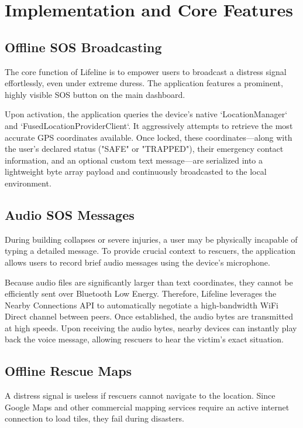 
\chapter{Implementation and Core Features} 

\label{Chapter4}

\section{Offline SOS Broadcasting}
The core function of Lifeline is to empower users to broadcast a distress signal effortlessly, even under extreme duress. The application features a prominent, highly visible SOS button on the main dashboard. 

Upon activation, the application queries the device's native `LocationManager` and `FusedLocationProviderClient`. It aggressively attempts to retrieve the most accurate GPS coordinates available. Once locked, these coordinates—along with the user's declared status ("SAFE" or "TRAPPED"), their emergency contact information, and an optional custom text message—are serialized into a lightweight byte array payload and continuously broadcasted to the local environment.

\section{Audio SOS Messages}
During building collapses or severe injuries, a user may be physically incapable of typing a detailed message. To provide crucial context to rescuers, the application allows users to record brief audio messages using the device's microphone. 

Because audio files are significantly larger than text coordinates, they cannot be efficiently sent over Bluetooth Low Energy. Therefore, Lifeline leverages the Nearby Connections API to automatically negotiate a high-bandwidth WiFi Direct channel between peers. Once established, the audio bytes are transmitted at high speeds. Upon receiving the audio bytes, nearby devices can instantly play back the voice message, allowing rescuers to hear the victim's exact situation.

\section{Offline Rescue Maps}
A distress signal is useless if rescuers cannot navigate to the location. Since Google Maps and other commercial mapping services require an active internet connection to load tiles, they fail during disasters.

